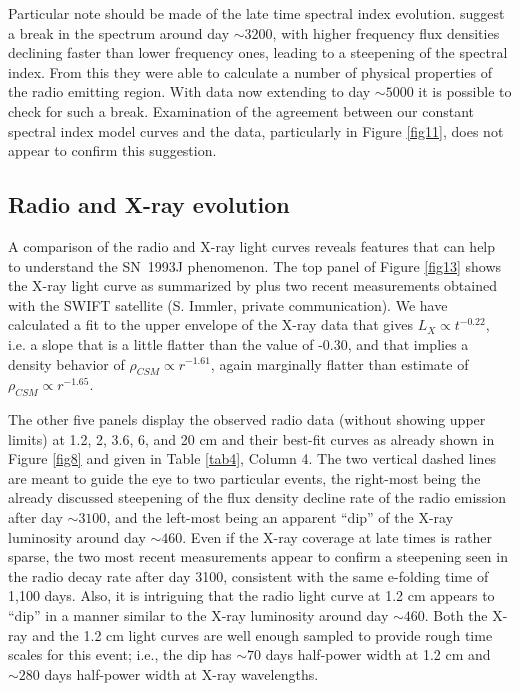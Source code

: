 \documentclass[12pt,preprint]{aastex}
\begin{document}
Particular note should be made of the late time spectral index evolution. \cite{Chandra04} suggest a break in the spectrum around day $\sim3200$, with higher frequency flux densities declining faster than lower frequency ones, leading to a steepening of the spectral index. From this they were able to calculate a number of physical properties of the radio emitting region. With data now extending to day $\sim5000$ it is possible to check for such a break. Examination of the agreement between our constant spectral index model curves and the data, particularly in Figure \ref{fig11}, does not appear to confirm this suggestion. 

\subsection{Radio and X-ray evolution \label{Radio-X-Ray}}

A comparison of the radio and X-ray light curves reveals features that can help to understand the SN~1993J
phenomenon.  The top panel of Figure \ref{fig13} shows the X-ray light curve as summarized by \cite{Zimmermann03} plus two recent measurements obtained with the SWIFT satellite (S. Immler, private communication). We have calculated a fit to the upper envelope of the X-ray data that gives $L_X \propto t^{-0.22}$, i.e. a slope that is a little flatter than the \citet{Zimmermann03} value of -0.30, and that implies a density behavior of $\rho_{CSM} \propto r^{-1.61}$, again marginally flatter than \citet{Zimmermann03} estimate of $\rho_{CSM} \propto r^{-1.65}$.

The other five panels display the observed radio data (without showing
upper limits) at 1.2, 2, 3.6, 6, and 20 cm and their best-fit curves as
already shown in Figure \ref{fig8} and given in Table \ref{tab4},
Column 4. The two vertical dashed lines are meant to guide the eye to
two particular events, the right-most being the already discussed
steepening of the flux density decline rate of the radio emission after
day $\sim3100$, and the left-most being an apparent ``dip'' of the X-ray
luminosity around day $\sim460$. Even if the X-ray coverage at late
times is rather sparse, the two most recent measurements  appear to
confirm a  steepening seen in the radio decay rate after day
3100, consistent with the same e-folding time of 1,100 days. Also, it is intriguing that the radio light curve at 1.2 cm
appears to ``dip'' in a manner similar to the X-ray luminosity around
day $\sim460$. Both the X-ray and the 1.2 cm light curves are well
enough sampled to provide rough time scales for this event; i.e., the
dip has $\sim70$ days half-power width at 1.2 cm and $\sim280$ days
half-power width at X-ray wavelengths. 
\end{document}
